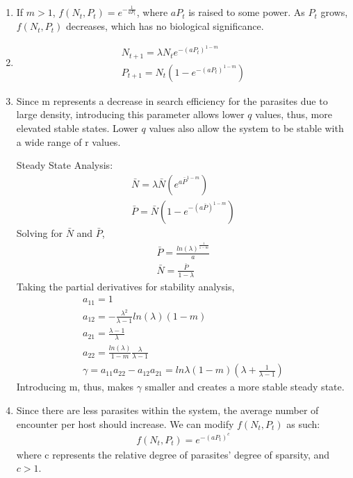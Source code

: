 \begin{homeworkProblem}[10]
\begin{enumerate}
    \item 
    If $m > 1$, $f(N_t, P_t) = e^{-\frac{1}{aP_t}}$, where $aP_t$ is raised to some power. As $P_t$ grows, $f(N_t, P_t)$ decreases, which has no biological significance.
    
    \item 
    \begin{align*}
        N_{t+1} = \lambda N_{t} e^{-(aP_t)^{1-m}}\\
        P_{t+1} = N_t (1 - e^{-(aP_t)^{1-m}})
    \end{align*}
    
    \item
    Since m represents a decrease in search efficiency for the parasites due to large density, introducing this parameter allows lower $q$ values, thus, more elevated stable states. Lower $q$ values also allow the system to be stable with a wide range of r values. 
    
    Steady State Analysis: \begin{align*}
        \bar{N} = \lambda \bar{N} (e^{a\bar{P}}^{1-m})\\
        \bar{P} = \bar{N} (1 - e^{-(a\bar{P})^{1-m}})
    \end{align*}
    Solving for $\bar{N}$ and $\bar{P}$, \begin{align*}
        \bar{P} = \frac{ln(\lambda)^{\frac{1}{1-m}}}{a}\\
        \bar{N} = \frac{\bar{P}}{1-\lambda}
    \end{align*}
    Taking the partial derivatives for stability analysis, \begin{align}
        a_{11} = 1 \\
        a_{12} = -\frac{\lambda^2}{\lambda - 1}ln(\lambda)(1-m) \\
        a_{21} = \frac{\lambda - 1}{\lambda} \\
        a_{22} = \frac{ln(\lambda)}{1-m}\frac{\lambda}{\lambda-1}\\
        \gamma = a_{11}a_{22}-a_{12}a_{21} = ln\lambda (1-m)(\lambda + \frac{1}{\lambda -1 })
    \end{align}
    Introducing m, thus, makes $\gamma$ smaller and creates a more stable steady state.
    
    \item Since there are less parasites within the system, the average number of encounter per host should increase. We can modify $f(N_t, P_t)$ as such: \begin{align*}
        f(N_t, P_t) = e^{-(aP_t)^{c}}
    \end{align*}
    where c represents the relative degree of parasites' degree of sparsity, and $c > 1$.
    
    
\end{enumerate}
\end{homeworkProblem}
